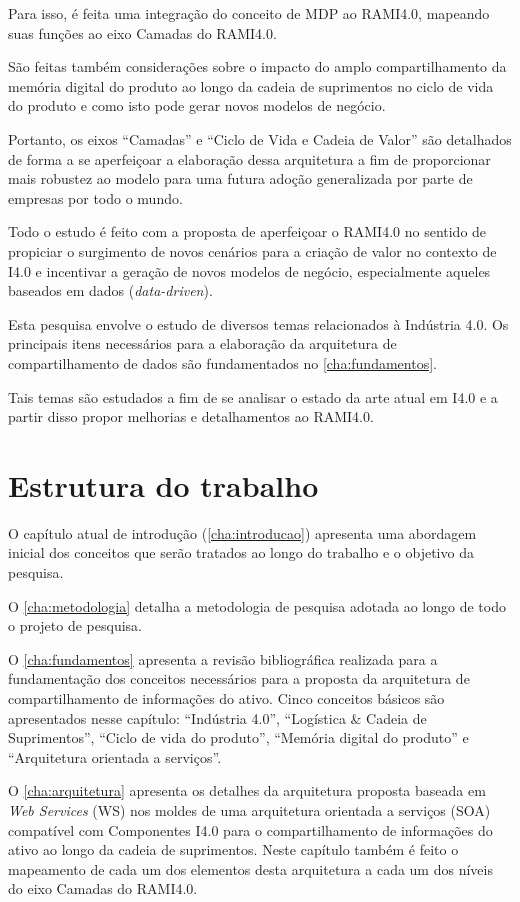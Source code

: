 	Para isso, é feita uma integração do conceito de MDP ao RAMI4.0, mapeando suas funções ao eixo Camadas do RAMI4.0.

	São feitas também considerações sobre o impacto do amplo compartilhamento da memória digital do produto ao longo da cadeia de suprimentos no ciclo de vida do produto e como isto pode gerar novos modelos de negócio.

	Portanto, os eixos ``Camadas'' e ``Ciclo de Vida e Cadeia de Valor'' são detalhados de forma a se aperfeiçoar a elaboração dessa arquitetura a fim de proporcionar mais robustez ao modelo para uma futura adoção generalizada por parte de empresas por todo o mundo.

	Todo o estudo é feito com a proposta de aperfeiçoar o RAMI4.0 no sentido de propiciar o surgimento de novos cenários para a criação de valor no contexto de I4.0 e incentivar a geração de novos modelos de negócio, especialmente aqueles baseados em dados (\textit{data-driven}).
	
	Esta pesquisa envolve o estudo de diversos temas relacionados à Indústria 4.0. Os principais itens necessários para a elaboração da arquitetura de compartilhamento de dados são fundamentados no \autoref{cha:fundamentos}.
	
	Tais temas são estudados a fim de se analisar o estado da arte atual em I4.0 e a partir disso propor melhorias e detalhamentos ao RAMI4.0.

\section{Estrutura do trabalho}

	O capítulo atual de introdução (\autoref{cha:introducao}) apresenta uma abordagem inicial dos conceitos que serão tratados ao longo do trabalho e o objetivo da pesquisa.
	
	O \autoref{cha:metodologia} detalha a metodologia de pesquisa adotada ao longo de todo o projeto de pesquisa.
	
	O \autoref{cha:fundamentos} apresenta a revisão bibliográfica realizada para a fundamentação dos conceitos necessários para a proposta da arquitetura de compartilhamento de informações do ativo. Cinco conceitos básicos são apresentados nesse capítulo: ``Indústria 4.0'', ``Logística \& Cadeia de Suprimentos'', ``Ciclo de vida do produto'', ``Memória digital do produto'' e ``Arquitetura orientada a serviços''.
	
	O \autoref{cha:arquitetura} apresenta os detalhes da arquitetura proposta baseada em \textit{Web Services} (WS) nos moldes de uma arquitetura orientada a serviços (SOA) compatível com Componentes I4.0 para o compartilhamento de informações do ativo ao longo da cadeia de suprimentos. Neste capítulo também é feito o mapeamento de cada um dos elementos desta arquitetura a cada um dos níveis do eixo Camadas do RAMI4.0.
	
